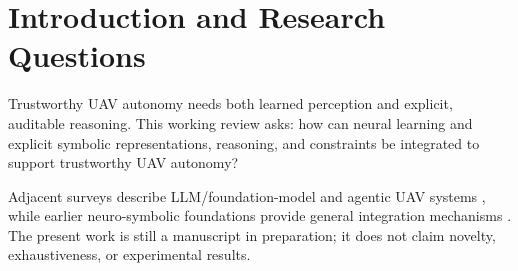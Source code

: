 \section{Introduction and Research Questions}

Trustworthy UAV autonomy needs both learned perception and explicit, auditable
reasoning. This working review asks: how can neural learning and explicit
symbolic representations, reasoning, and constraints be integrated to support
trustworthy UAV autonomy?

Adjacent surveys describe LLM/foundation-model and agentic UAV systems
\cite{p_2501_02341,p_2506_08045}, while earlier neuro-symbolic foundations
provide general integration mechanisms \cite{p_2012_05876,p_1805_10872}.
The present work is still a manuscript in preparation; it does not claim
novelty, exhaustiveness, or experimental results.
